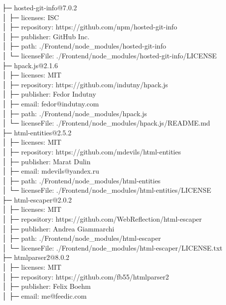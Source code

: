 \documentclass[
    paper=a4,
    twoside=false,
    parskip=half,
    listof=entryprefix,
    listof=totoc,
    index=totoc,
    bibliography=totoc,
    headsepline,
]{scrbook}
\begin{document}
    ├─ hosted-git-info@7.0.2\\
    │  ├─ licenses: ISC\\
    │  ├─ repository: https://github.com/npm/hosted-git-info\\
    │  ├─ publisher: GitHub Inc.\\
    │  ├─ path: ./Frontend/node\_modules/hosted-git-info\\
    │  └─ licenseFile: ./Frontend/node\_modules/hosted-git-info/LICENSE\\
    ├─ hpack.js@2.1.6\\
    │  ├─ licenses: MIT\\
    │  ├─ repository: https://github.com/indutny/hpack.js\\
    │  ├─ publisher: Fedor Indutny\\
    │  ├─ email: fedor@indutny.com\\
    │  ├─ path: ./Frontend/node\_modules/hpack.js\\
    │  └─ licenseFile: ./Frontend/node\_modules/hpack.js/README.md\\
    ├─ html-entities@2.5.2\\
    │  ├─ licenses: MIT\\
    │  ├─ repository: https://github.com/mdevils/html-entities\\
    │  ├─ publisher: Marat Dulin\\
    │  ├─ email: mdevils@yandex.ru\\
    │  ├─ path: ./Frontend/node\_modules/html-entities\\
    │  └─ licenseFile: ./Frontend/node\_modules/html-entities/LICENSE\\
    ├─ html-escaper@2.0.2\\
    │  ├─ licenses: MIT\\
    │  ├─ repository: https://github.com/WebReflection/html-escaper\\
    │  ├─ publisher: Andrea Giammarchi\\
    │  ├─ path: ./Frontend/node\_modules/html-escaper\\
    │  └─ licenseFile: ./Frontend/node\_modules/html-escaper/LICENSE.txt\\
    ├─ htmlparser2@8.0.2\\
    │  ├─ licenses: MIT\\
    │  ├─ repository: https://github.com/fb55/htmlparser2\\
    │  ├─ publisher: Felix Boehm\\
    │  ├─ email: me@feedic.com\\
\end{document}
